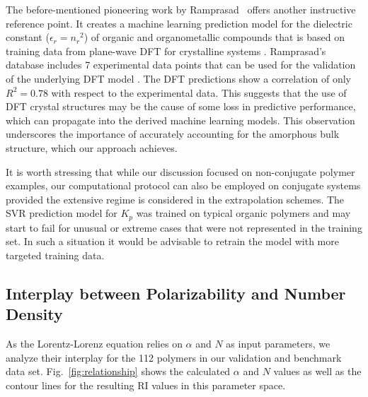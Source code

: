 The before-mentioned pioneering work by Ramprasad \etal\ offers another instructive reference point. It creates a machine learning prediction model for the dielectric constant ($\epsilon_r = {n_r}^2$) of organic and organometallic compounds that is based on training data from plane-wave DFT for crystalline systems \cite{Huan2016,Sharma2014}. Ramprasad’s database includes 7 experimental data points that can be used for the validation of the underlying DFT model \cite{Mannodi-Kanakkithodi2016}. The DFT predictions show a correlation of only $R^2 = 0.78$ with respect to the experimental data. This suggests that the use of DFT crystal structures may be the cause of some loss in predictive performance, which can propagate into the derived machine learning models. This observation underscores the importance of accurately accounting for the amorphous bulk structure, which our approach achieves. 

It is worth stressing that while our discussion focused on non-conjugate polymer examples, our computational protocol can also be employed on conjugate systems provided the extensive regime is considered in the extrapolation schemes. The SVR prediction model for $K_p$ was trained on typical organic polymers and may start to fail for unusual or extreme cases that were not represented in the training set. In such a situation it would be advisable to retrain the model with more targeted training data. 


\subsection{Interplay between Polarizability and Number Density}
\label{subsec:interplay_results}
As the Lorentz-Lorenz equation relies on $\alpha$ and $N$ as input parameters, we analyze their interplay for the 112 polymers in our validation and benchmark data set.
Fig.\ \ref{fig:relationship} shows the calculated $\alpha$ and $N$ values as well as the contour lines for the resulting RI values in this parameter space. 

